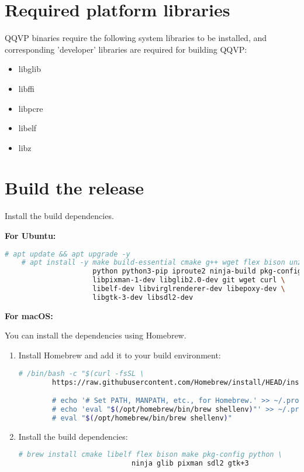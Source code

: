 \section{Required platform libraries}

QQVP binaries require the following system libraries to be installed, and corresponding 'developer' libraries are required for building QQVP:

\begin{itemize}
\item libglib
\item libffi
\item libpcre
\item libelf
\item libz
\end{itemize}


\section{Build the release}

Install the build dependencies.

\textbf{For Ubuntu:}

\small
\begin{lstlisting}[language=bash]
    # apt update && apt upgrade -y
    # apt install -y make build-essential cmake g++ wget flex bison unzip \
                     python python3-pip iproute2 ninja-build pkg-config \
                     libpixman-1-dev libglib2.0-dev git wget curl \
                     libelf-dev libvirglrenderer-dev libepoxy-dev \
                     libgtk-3-dev libsdl2-dev
\end{lstlisting}
\normalsize

\clearpage
\textbf{For macOS:}

You can install the dependencies using Homebrew.

\begin{enumerate}

\item Install Homebrew and add it to your build environment:
	\small
	\begin{lstlisting}[language=bash]
	    # /bin/bash -c "$(curl -fsSL \
	    https://raw.githubusercontent.com/Homebrew/install/HEAD/install.sh)"

	    # echo '# Set PATH, MANPATH, etc., for Homebrew.' >> ~/.profile
	    # echo 'eval "$(/opt/homebrew/bin/brew shellenv)"' >> ~/.profile
	    # eval "$(/opt/homebrew/bin/brew shellenv)"
	\end{lstlisting}
	\normalsize

\item Install the build dependencies:

	\small
	\begin{lstlisting}[language=bash]
	    # brew install cmake libelf flex bison make pkg-config python \
                           ninja glib pixman sdl2 gtk+3
	\end{lstlisting}
	\normalsize

\end{enumerate}

